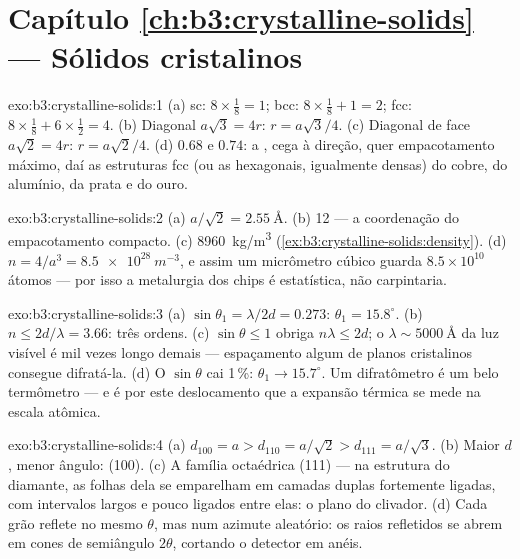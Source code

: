 \section*{Capítulo \ref{ch:b3:crystalline-solids} --- Sólidos cristalinos}

\begin{solution}{exo:b3:crystalline-solids:1}
(a) sc: $8\times\tfrac18 = 1$; bcc: $8\times\tfrac18 + 1 = 2$;
fcc: $8\times\tfrac18 + 6\times\tfrac12 = 4$. (b) Diagonal
$a\sqrt3 = 4r$: $r = a\sqrt3/4$. (c) Diagonal de face $a\sqrt2 = 4r$:
$r = a\sqrt2/4$. (d) $0.68$ e $0.74$: a , cega à
direção, quer empacotamento máximo, daí as estruturas fcc (ou as
hexagonais, igualmente densas) do cobre, do alumínio, da prata e do ouro.
\end{solution}

\begin{solution}{exo:b3:crystalline-solids:2}
(a) $a/\sqrt2 = \qty{2.55}{\angstrom}$. (b) 12 --- a
coordenação do empacotamento compacto. (c) \qty{8960}{kg/m^3}
(\cref{ex:b3:crystalline-solids:density}). (d) $n = 4/a^3 =
\qty{8.5e28}{m^{-3}}$, e assim um micrômetro cúbico guarda
$8.5\times10^{10}$ átomos --- por isso a metalurgia dos chips é
estatística, não carpintaria.
\end{solution}

\begin{solution}{exo:b3:crystalline-solids:3}
(a) $\sin\theta_1 = \lambda/2d = 0.273$: $\theta_1 =
15.8^\circ$. (b) $n \le 2d/\lambda = 3.66$: três ordens. (c)
$\sin\theta \le 1$ obriga $n\lambda \le 2d$; o
$\lambda \sim \qty{5000}{\angstrom}$ da luz visível é mil vezes longo demais
--- espaçamento algum de planos cristalinos consegue difratá-la. (d) O
$\sin\theta$ cai 1\,\%: $\theta_1 \to 15.7^\circ$. Um difratômetro é um
belo termômetro --- e é por este deslocamento que a expansão térmica se
mede na escala atômica.
\end{solution}

\begin{solution}{exo:b3:crystalline-solids:4}
(a) $d_{100} = a > d_{110} = a/\sqrt2 > d_{111} = a/\sqrt3$. (b)
Maior $d$, menor ângulo: (100). (c) A família octaédrica (111)
--- na estrutura do diamante, as folhas dela se emparelham em camadas
duplas fortemente ligadas, com intervalos largos e pouco ligados entre
elas: o plano do clivador. (d) Cada grão reflete no mesmo $\theta$,
mas num azimute aleatório: os raios refletidos se abrem em cones de
semiângulo $2\theta$, cortando o detector em anéis.
\end{solution}

